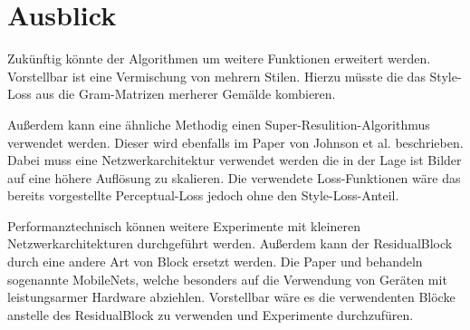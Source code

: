 \section{Ausblick}

Zukünftig könnte der Algorithmen um weitere Funktionen erweitert werden. Vorstellbar ist eine Vermischung von mehrern Stilen. Hierzu müsste die das Style-Loss aus die Gram-Matrizen merherer Gemälde kombieren.

Außerdem kann eine ähnliche Methodig einen Super-Resulition-Algorithmus verwendet werden. Dieser wird ebenfalls im Paper von Johnson et al. \cite{DBLP:journals/corr/JohnsonAL16} beschrieben. Dabei muss eine Netzwerkarchitektur verwendet werden die in der Lage ist Bilder auf eine höhere Auflösung zu skalieren. Die verwendete Loss-Funktionen wäre das bereits vorgestellte Perceptual-Loss jedoch ohne den Style-Loss-Anteil.

Performanztechnisch können weitere Experimente mit kleineren Netzwerkarchitekturen durchgeführt werden. Außerdem kann der ResidualBlock durch eine andere Art von Block ersetzt werden. Die Paper \cite{DBLP:journals/corr/HowardZCKWWAA17} und \cite{DBLP:journals/corr/abs-1801-04381} behandeln sogenannte MobileNets, welche besonders auf die Verwendung von Geräten mit leistungsarmer Hardware abziehlen. Vorstellbar wäre es die verwendenten Blöcke anstelle des ResidualBlock zu verwenden und Experimente durchzufüren.